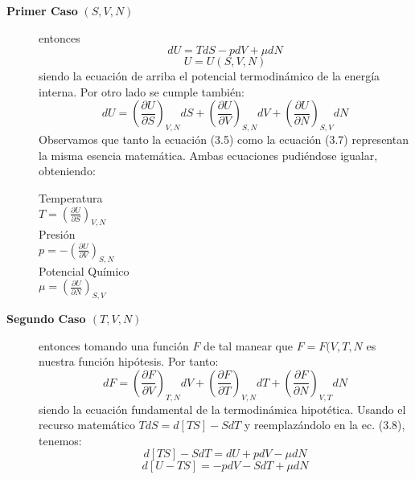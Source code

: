 \begin{description}
    \item[\textbf{Primer Caso}  $(S,V,N)$] {
        entonces 
        \begin{equation}
            dU = TdS - pdV + \mu dN  \tag{3.5}
        \end{equation}
        \begin{equation}
             U = U(S,V,N) \tag{3.6}
        \end{equation}
siendo la ecuación de arriba el potencial termodinámico de la energía interna.
        Por otro lado se cumple también:
        \begin{equation}
            dU = \left( \frac{\partial U}{\partial S} \right)_{V,N}dS +
            \left( \frac{\partial U}{\partial V} \right)_{S,N}dV +
            \left( \frac{\partial U}{\partial N} \right)_{S,V}dN \tag{3.7}
        \end{equation}
Observamos que tanto la ecuación (3.5) como la ecuación (3.7) representan la misma esencia matemática. Ambas ecuaciones pudiéndose igualar, obteniendo:
        \begin{multicols}{3}
                Temperatura \\[4pt]
                $T=\left( \frac{\partial U}{\partial S} \right)_{V,N}$
                \columnbreak \\
                Presión \\[4pt]
                $p=-\left( \frac{\partial U}{\partial V} \right)_{S,N}$
                \columnbreak  \\
                Potencial Químico \\[4pt]
                $\mu=\left( \frac{\partial U}{\partial N} \right)_{S,V}$
        \end{multicols}
    }
    \item [\textbf{Segundo Caso  $(T,V,N)$}] {
    entonces tomando una función $F$ de tal manear que $F=F(V,T,N$ es nuestra función hipótesis. Por tanto:
    \begin{equation}
        dF=\left( \frac{\partial F}{\partial V} \right)_{T,N}dV + \left( \frac{\partial F}{\partial T} \right)_{V,N}dT + \left( \frac{\partial F}{\partial N} \right)_{V,T}dN \tag{3.8}
    \end{equation}siendo la ecuación fundamental de la termodinámica hipotética.
    Usando el recurso matemático $TdS = d[TS] -  SdT$ y reemplazándolo en la ec. (3.8), tenemos:
    \begin{equation}
        d[TS] - SdT = dU +pdV - \mu dN \tag{3.9}
    \end{equation}
    \begin{equation}
        d[U-TS] = -pdV - SdT + \mu dN \tag{3.10}
    \end{equation}
    }
\end{description}